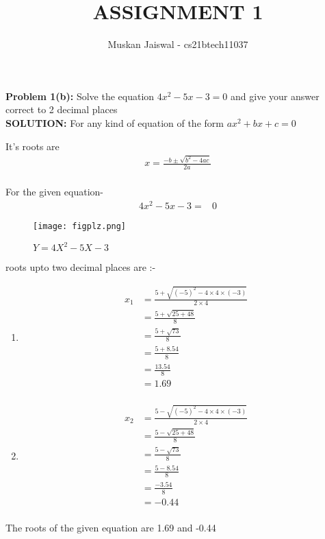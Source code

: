\documentclass[journal,12pt,two column]{IEEEtran}
\title{ASSIGNMENT 1 }
\author{Muskan Jaiswal - cs21btech11037}
\begin{document}
\maketitle
\textbf{Problem 1(b):} Solve the equation $4x^2-5x-3=0$ and give your answer correct to 2 decimal places
\\

\textbf{SOLUTION:}     For any kind of equation of the form  $ax^2+bx+c=0$

It's roots are
\\

\begin{align*}
x={\frac{-b\pm\sqrt{b^2-4ac}}{2a}}\\
\end{align*}

For the given equation-
\begin{align}
    4x^2-5x-3=&0
\end{align}
\begin{figure}[h!]
\centering
\texttt{[image: figplz.png]}
\caption{$Y=4X^2-5X-3 $}
\end{figure}

roots upto two decimal places are :-
    
 \begin{enumerate}
     \item 
 \begin{align*} 
x_1 &= \frac{5+\sqrt{(-5)^2-4\times4\times(-3)}}{2\times4}\\ 
&=\frac{5+\sqrt{25+48}}{8}\\ 
&=\frac{5+\sqrt{73}}{8}\\
 &=\frac{5+8.54}{8} \\ 
 &=\frac{13.54}{8}\\ 
 &=1.69 \\ 
\end{align*}
\item
\begin{align*}
x_2 &=\frac{5-\sqrt{(-5)^2-4\times4\times(-3)}}{2\times4}\\ 
&=\frac{5-\sqrt{25+48}}{8}\\ 
&=\frac{5-\sqrt{73}}{8}\\ 
&=\frac{5-8.54}{8} \\ 
&=\frac{-3.54}{8} \\ 
&=-0.44\\
\end{align*}
\end{enumerate}

The roots of the given equation are 1.69 and -0.44
\end{document}
